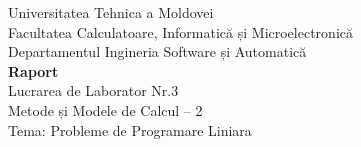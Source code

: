 \begin{titlepage}
\begin{center}
	{\large{ Universitatea Tehnica a Moldovei \\}}
	{\large{ Facultatea Calculatoare, Informatică și Microelectronică \\}}
	{\large{ Departamentul Ingineria Software și Automatică \\}}
	\vspace{4cm}
	{\LARGE {\bf{ Raport }}}\\
	\vspace{1cm}
	{\large { Lucrarea de Laborator Nr.3 \\}}
	{\large { Metode și Modele de Calcul – 2 \\}}
	{\large { Tema: Probleme de Programare Liniara \\}}
\end{center}

\vspace{5cm}

 \\
 \\
\noindent{\null} \\
 \\
 \\

\vspace{5cm}

\end{titlepage}
